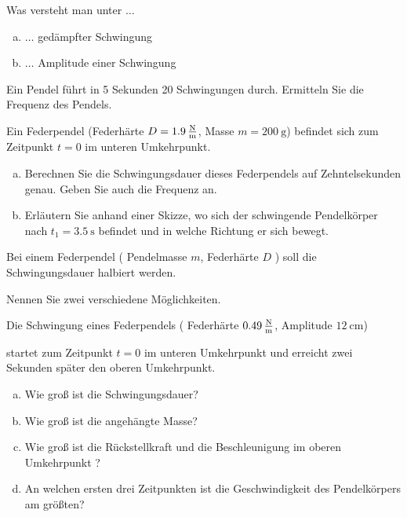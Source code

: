 \documentclass[a4paper]{article}
\begin{document}
\begin{enumerate}[1.]

{\bf \item Was versteht man unter $\dots$}

\begin{enumerate}[a)]
\item $\dots$ gedämpfter Schwingung
\item $\dots$ Amplitude einer Schwingung
\end{enumerate}

{\bf \item Ein Pendel führt in 5 Sekunden 20 Schwingungen durch. Ermitteln Sie die Frequenz des Pendels.}

{\bf \item Ein Federpendel (Federhärte $D=\SI{1,9}{\newton\over\meter}$, Masse $m=\SI{200}{\gram}$) befindet sich zum Zeitpunkt $t=0$ im unteren Umkehrpunkt.}

\begin{enumerate}[a)]
\item Berechnen Sie die Schwingungsdauer dieses Federpendels auf Zehntelsekunden genau. Geben Sie auch die Frequenz an.
\item Erläutern Sie anhand einer Skizze, wo sich der schwingende Pendelkörper nach 
$t_1=\SI{3,5}{\second}$ befindet und in welche Richtung er sich bewegt.
\end{enumerate}

{\bf \item Bei einem Federpendel ( Pendelmasse $m$, Federhärte $D$ ) soll die Schwingungsdauer halbiert werden.} Nennen Sie zwei verschiedene Möglichkeiten.


{\bf \item Die Schwingung eines Federpendels ( Federhärte $\SI{0,49}{\newton\over\meter}$, Amplitude $\SI{12}{\centi\meter}$)}
startet zum Zeitpunkt $t=0$ im unteren Umkehrpunkt und erreicht zwei Sekunden später den oberen Umkehrpunkt. 

\begin{enumerate}[a)]
\item Wie groß ist die Schwingungsdauer?
\item Wie groß ist die angehängte Masse?
\item Wie groß ist die Rückstellkraft und die Beschleunigung im oberen Umkehrpunkt ?
\item An welchen ersten drei Zeitpunkten ist die Geschwindigkeit des Pendelkörpers am größten?
\end{enumerate}


\end{enumerate}
\end{document}
